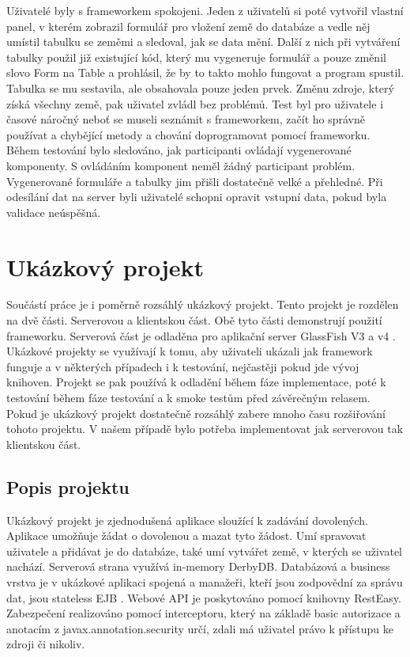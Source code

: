 Uživatelé byly s frameworkem spokojeni. Jeden z uživatelů si poté vytvořil vlastní panel, v kterém zobrazil formulář pro vložení země do databáze a vedle něj umístil tabulku se zeměmi a sledoval, jak se data mění. Další z nich při vytváření tabulky použil již existující kód, který mu vygeneruje formulář a pouze změnil slovo Form na Table a prohlásil, že by to takto mohlo fungovat a program spustil. Tabulka se mu sestavila, ale obsahovala pouze jeden prvek. Změnu zdroje, který získá všechny země, pak uživatel zvládl bez problémů. Test byl pro uživatele i časové náročný neboť se museli seznámit s frameworkem, začít ho správně používat a chybějící metody a chování doprogramovat pomocí frameworku. Během testování bylo sledováno, jak participanti ovládají vygenerované komponenty. S ovládáním komponent neměl žádný participant problém. Vygenerované formuláře a tabulky jim přišli dostatečně velké a přehledné. Při odesílání dat na server byli uživatelé schopni opravit vstupní data, pokud byla validace neúspěšná. 

\section{Ukázkový projekt}
Součástí práce je i poměrně rozsáhlý ukázkový projekt. Tento projekt je rozdělen na dvě části. Serverovou a klientskou část. Obě tyto části demonstrují použití frameworku. Serverová část je odladěna pro aplikační server GlassFish V3 a v4 \cite{glassfish}. Ukázkové projekty se využívají k tomu, aby uživateli ukázali jak framework funguje a v některých případech i k testování, nejčastěji pokud jde vývoj knihoven. Projekt se pak používá k odladění během fáze implementace, poté k testování během fáze testování a k smoke testům před závěrečným relasem. Pokud je ukázkový projekt dostatečně rozsáhlý zabere mnoho času rozšiřování tohoto projektu. V našem případě bylo potřeba implementovat jak serverovou tak klientskou část.
\subsection{Popis projektu}
Ukázkový projekt je zjednodušená aplikace sloužící k zadávání dovolených. Aplikace umožňuje žádat o dovolenou a mazat tyto žádost. Umí spravovat uživatele a přidávat je do databáze, také umí vytvářet země, v kterých se uživatel nachází. Serverová strana využívá in-memory DerbyDB. Databázová a business vrstva je v ukázkové aplikaci spojená a manažeři, kteří jsou zodpovědní za správu dat, jsou stateless EJB \cite{javaEE}. Webové API je poskytováno pomocí knihovny RestEasy. Zabezpečení realizováno pomocí interceptoru, který na základě basic autorizace a anotacím z javax.annotation.security určí, zdali má uživatel právo k přístupu ke zdroji či nikoliv.

